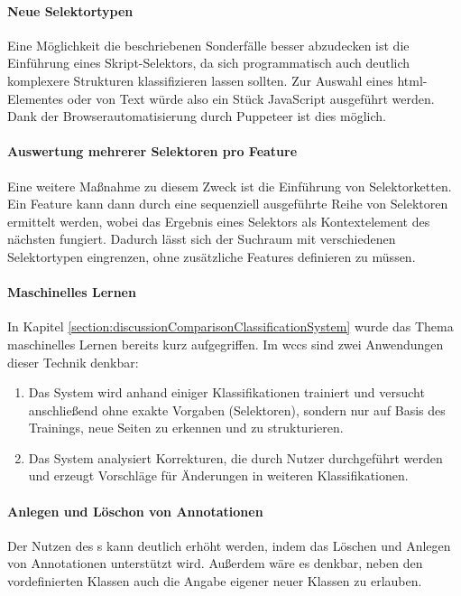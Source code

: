     \paragraph{Neue Selektortypen}
    Eine Möglichkeit die beschriebenen Sonderfälle besser abzudecken ist die
    Einführung eines Skript-Selektors,
    da sich programmatisch auch deutlich komplexere Strukturen klassifizieren lassen sollten.
    Zur Auswahl eines \gls{html}-Elementes oder von Text würde also ein Stück JavaScript ausgeführt werden.
    Dank der Browserautomatisierung durch Puppeteer ist dies möglich.

    \paragraph{Auswertung mehrerer Selektoren pro Feature}
    Eine weitere Maßnahme zu diesem Zweck ist die Einführung von Selektorketten.
    Ein Feature kann dann durch eine sequenziell ausgeführte Reihe von Selektoren
    ermittelt werden, wobei das Ergebnis eines Selektors als Kontextelement des nächsten fungiert.
    Dadurch lässt sich der Suchraum mit verschiedenen Selektortypen eingrenzen,
    ohne zusätzliche Features definieren zu müssen.

    \paragraph{Maschinelles Lernen}
    In Kapitel \ref{section:discussionComparisonClassificationSystem}
    wurde das Thema maschinelles Lernen bereits kurz aufgegriffen.
    Im \gls{wccs} sind zwei Anwendungen dieser Technik denkbar:

    \begin{enumerate}
        \item   Das System wird anhand einiger Klassifikationen trainiert
                und versucht anschließend ohne exakte Vorgaben (Selektoren),
                sondern nur auf Basis des Trainings,
                neue Seiten zu erkennen und zu strukturieren.
        \item   Das System analysiert Korrekturen, die durch Nutzer durchgeführt werden
                und erzeugt Vorschläge für Änderungen in weiteren Klassifikationen.
    \end{enumerate}

    \paragraph{Anlegen und Löschon von Annotationen}
    Der Nutzen des {\annotatorPlugin}s kann deutlich erhöht werden,
    indem das Löschen und Anlegen von Annotationen unterstützt wird.
    Außerdem wäre es denkbar, neben den vordefinierten Klassen auch
    die Angabe eigener neuer Klassen zu erlauben.
